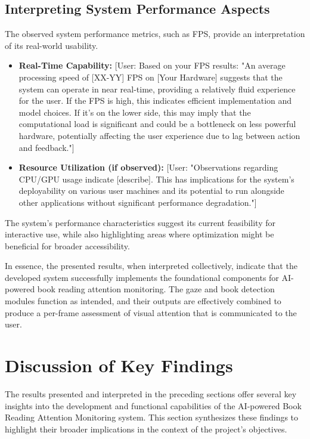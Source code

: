 \subsection{Interpreting System Performance Aspects}
The observed system performance metrics, such as FPS, provide an interpretation of its real-world usability.
\begin{itemize}
    \item \textbf{Real-Time Capability:} [User: Based on your FPS results: "An average processing speed of [XX-YY] FPS on [Your Hardware] suggests that the system can operate in near real-time, providing a relatively fluid experience for the user. If the FPS is high, this indicates efficient implementation and model choices. If it's on the lower side, this may imply that the computational load is significant and could be a bottleneck on less powerful hardware, potentially affecting the user experience due to lag between action and feedback."]
    
    \item \textbf{Resource Utilization (if observed):} [User: "Observations regarding CPU/GPU usage indicate [describe]. This has implications for the system's deployability on various user machines and its potential to run alongside other applications without significant performance degradation."]
\end{itemize}
The system's performance characteristics suggest its current feasibility for interactive use, while also highlighting areas where optimization might be beneficial for broader accessibility.

In essence, the presented results, when interpreted collectively, indicate that the developed system successfully implements the foundational components for AI-powered book reading attention monitoring. The gaze and book detection modules function as intended, and their outputs are effectively combined to produce a per-frame assessment of visual attention that is communicated to the user.


\section{Discussion of Key Findings}
The results presented and interpreted in the preceding sections offer several key insights into the development and functional capabilities of the AI-powered Book Reading Attention Monitoring system. This section synthesizes these findings to highlight their broader implications in the context of the project's objectives.

